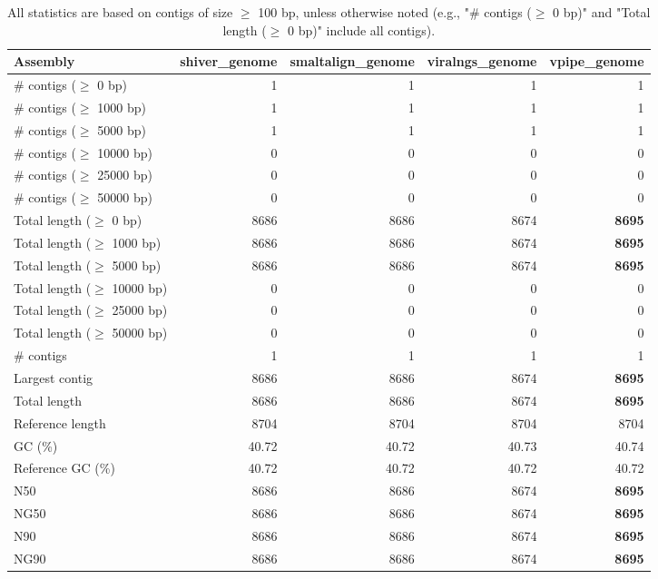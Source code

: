 \documentclass[12pt,a4paper]{article}
\begin{document}
\begin{table}[ht]
\begin{center}
\caption{All statistics are based on contigs of size $\geq$ 100 bp, unless otherwise noted (e.g., "\# contigs ($\geq$ 0 bp)" and "Total length ($\geq$ 0 bp)" include all contigs).}
\begin{tabular}{|l*{4}{|r}|}
\hline
Assembly & shiver\_genome & smaltalign\_genome & viralngs\_genome & vpipe\_genome \\ \hline
\# contigs ($\geq$ 0 bp) & 1 & 1 & 1 & 1 \\ \hline
\# contigs ($\geq$ 1000 bp) & 1 & 1 & 1 & 1 \\ \hline
\# contigs ($\geq$ 5000 bp) & 1 & 1 & 1 & 1 \\ \hline
\# contigs ($\geq$ 10000 bp) & 0 & 0 & 0 & 0 \\ \hline
\# contigs ($\geq$ 25000 bp) & 0 & 0 & 0 & 0 \\ \hline
\# contigs ($\geq$ 50000 bp) & 0 & 0 & 0 & 0 \\ \hline
Total length ($\geq$ 0 bp) & 8686 & 8686 & 8674 & {\bf 8695} \\ \hline
Total length ($\geq$ 1000 bp) & 8686 & 8686 & 8674 & {\bf 8695} \\ \hline
Total length ($\geq$ 5000 bp) & 8686 & 8686 & 8674 & {\bf 8695} \\ \hline
Total length ($\geq$ 10000 bp) & 0 & 0 & 0 & 0 \\ \hline
Total length ($\geq$ 25000 bp) & 0 & 0 & 0 & 0 \\ \hline
Total length ($\geq$ 50000 bp) & 0 & 0 & 0 & 0 \\ \hline
\# contigs & 1 & 1 & 1 & 1 \\ \hline
Largest contig & 8686 & 8686 & 8674 & {\bf 8695} \\ \hline
Total length & 8686 & 8686 & 8674 & {\bf 8695} \\ \hline
Reference length & 8704 & 8704 & 8704 & 8704 \\ \hline
GC (\%) & 40.72 & 40.72 & 40.73 & 40.74 \\ \hline
Reference GC (\%) & 40.72 & 40.72 & 40.72 & 40.72 \\ \hline
N50 & 8686 & 8686 & 8674 & {\bf 8695} \\ \hline
NG50 & 8686 & 8686 & 8674 & {\bf 8695} \\ \hline
N90 & 8686 & 8686 & 8674 & {\bf 8695} \\ \hline
NG90 & 8686 & 8686 & 8674 & {\bf 8695} \\ \hline

\end{tabular}
\end{center}
\end{table}
\end{document}
